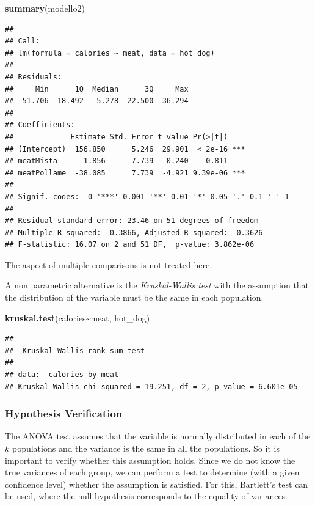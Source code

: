 \documentclass[
]{article}
\newenvironment{Shaded}{\begin{snugshade}}{\end{snugshade}}
\newcommand{\FunctionTok}[1]{\textcolor[rgb]{0.13,0.29,0.53}{\textbf{#1}}}
\newcommand{\NormalTok}[1]{#1}
\newcommand{\SpecialCharTok}[1]{\textcolor[rgb]{0.81,0.36,0.00}{\textbf{#1}}}
\begin{document}
\begin{Shaded}
\begin{Highlighting}[]
\FunctionTok{summary}\NormalTok{(modello2)}
\end{Highlighting}
\end{Shaded}

\begin{verbatim}
## 
## Call:
## lm(formula = calories ~ meat, data = hot_dog)
## 
## Residuals:
##     Min      1Q  Median      3Q     Max 
## -51.706 -18.492  -5.278  22.500  36.294 
## 
## Coefficients:
##             Estimate Std. Error t value Pr(>|t|)    
## (Intercept)  156.850      5.246  29.901  < 2e-16 ***
## meatMista      1.856      7.739   0.240    0.811    
## meatPollame  -38.085      7.739  -4.921 9.39e-06 ***
## ---
## Signif. codes:  0 '***' 0.001 '**' 0.01 '*' 0.05 '.' 0.1 ' ' 1
## 
## Residual standard error: 23.46 on 51 degrees of freedom
## Multiple R-squared:  0.3866, Adjusted R-squared:  0.3626 
## F-statistic: 16.07 on 2 and 51 DF,  p-value: 3.862e-06
\end{verbatim}

The aspect of multiple comparisons is not treated here.

A non parametric alternative is the \emph{Kruskal-Wallis test} with the
assumption that the distribution of the variable must be the same in
each population.

\begin{Shaded}
\begin{Highlighting}[]
\FunctionTok{kruskal.test}\NormalTok{(calories}\SpecialCharTok{\textasciitilde{}}\NormalTok{meat, hot\_dog)}
\end{Highlighting}
\end{Shaded}

\begin{verbatim}
## 
##  Kruskal-Wallis rank sum test
## 
## data:  calories by meat
## Kruskal-Wallis chi-squared = 19.251, df = 2, p-value = 6.601e-05
\end{verbatim}

\hypertarget{hypothesis-verification}{%
\subsubsection{Hypothesis Verification}\label{hypothesis-verification}}

The ANOVA test assumes that the variable is normally distributed in each
of the \(k\) populations and the variance is the same in all the
populations. So it is important to verify whether this assumption holds.
Since we do not know the true variances of each group, we can perform a
test to determine (with a given confidence level) whether the assumption
is satisfied. For this, Bartlett's test can be used, where the null
hypothesis corresponds to the equality of variances
\end{document}
